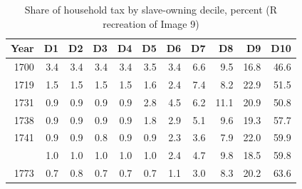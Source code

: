 \begin{table}

\caption{Share of household tax by slave-owning decile, percent (R recreation of Image 9)}
\centering
\begin{tabular}[t]{rrrrrrrrrrr}
\toprule
Year & D1 & D2 & D3 & D4 & D5 & D6 & D7 & D8 & D9 & D10\\
\midrule
1700 & 3.4 & 3.4 & 3.4 & 3.4 & 3.5 & 3.4 & 6.6 & 9.5 & 16.8 & 46.6\\
1719 & 1.5 & 1.5 & 1.5 & 1.5 & 1.6 & 2.4 & 7.4 & 8.2 & 22.9 & 51.5\\
1731 & 0.9 & 0.9 & 0.9 & 0.9 & 2.8 & 4.5 & 6.2 & 11.1 & 20.9 & 50.8\\
1738 & 0.9 & 0.9 & 0.9 & 0.9 & 1.8 & 2.9 & 5.1 & 9.6 & 19.3 & 57.7\\
1741 & 0.9 & 0.9 & 0.8 & 0.9 & 0.9 & 2.3 & 3.6 & 7.9 & 22.0 & 59.9\\
\addlinespace
1757 & 1.0 & 1.0 & 1.0 & 1.0 & 1.0 & 2.4 & 4.7 & 9.8 & 18.5 & 59.8\\
1773 & 0.7 & 0.8 & 0.7 & 0.7 & 0.7 & 1.1 & 3.0 & 8.3 & 20.2 & 63.6\\
\bottomrule
\end{tabular}
\end{table}
